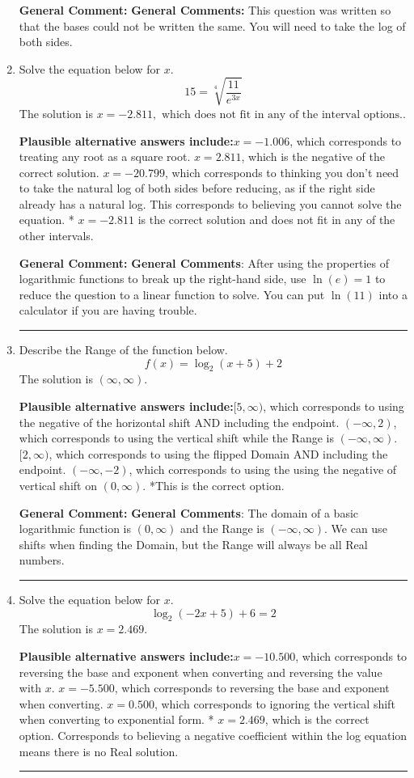\documentclass{extbook}[14pt]
\newcommand{\litem}[1]{\item #1

\rule{\textwidth}{0.4pt}}
\begin{document}
\begin{enumerate}
{\textbf{General Comment:} \textbf{General Comments:} This question was written so that the bases could not be written the same. You will need to take the log of both sides.
}
\litem{
Solve the equation below for $x$.
\[  15 = \sqrt[4]{\frac{11}{e^{3x}}} \]The solution is \( x = -2.811, \text{ which does not fit in any of the interval options.} \).\begin{enumerate}[label=\Alph*.]
\textbf{Plausible alternative answers include:}$x = -1.006$, which corresponds to treating any root as a square root.
$x = 2.811$, which is the negative of the correct solution.
$x = -20.799$, which corresponds to thinking you don't need to take the natural log of both sides before reducing, as if the right side already has a natural log.
This corresponds to believing you cannot solve the equation.
* $x = -2.811$ is the correct solution and does not fit in any of the other intervals.
\end{enumerate}

\textbf{General Comment:} \textbf{General Comments}: After using the properties of logarithmic functions to break up the right-hand side, use $\ln(e) = 1$ to reduce the question to a linear function to solve. You can put $\ln(11)$ into a calculator if you are having trouble.
}
\litem{
Describe the Range of the function below.
\[ f(x) = \log_2{(x+5)}+2 \]The solution is \( (\infty, \infty) \).\begin{enumerate}[label=\Alph*.]
\textbf{Plausible alternative answers include:}$[5, \infty)$, which corresponds to using the negative of the horizontal shift AND including the endpoint.
$(-\infty, 2)$, which corresponds to using the vertical shift while the Range is $(-\infty, \infty)$.
$[2, \infty)$, which corresponds to using the flipped Domain AND including the endpoint.
$(-\infty, -2)$, which corresponds to using the using the negative of vertical shift on $(0, \infty)$.
*This is the correct option.
\end{enumerate}

\textbf{General Comment:} \textbf{General Comments}: The domain of a basic logarithmic function is $(0, \infty)$ and the Range is $(-\infty, \infty)$. We can use shifts when finding the Domain, but the Range will always be all Real numbers.
}
\litem{
Solve the equation below for $x$.
\[ \log_{2}{(-2x+5)}+6 = 2 \]The solution is \( x = 2.469 \).\begin{enumerate}[label=\Alph*.]
\textbf{Plausible alternative answers include:}$x = -10.500$, which corresponds to reversing the base and exponent when converting and reversing the value with $x$.
$x = -5.500$, which corresponds to reversing the base and exponent when converting.
$x = 0.500$, which corresponds to ignoring the vertical shift when converting to exponential form.
* $x = 2.469$, which is the correct option.
Corresponds to believing a negative coefficient within the log equation means there is no Real solution.
\end{enumerate}

}
\end{enumerate}
\end{document}
